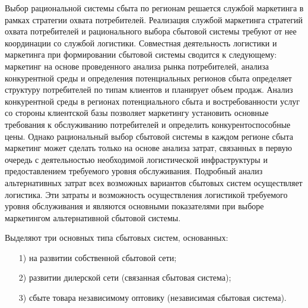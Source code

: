Выбор рациональной системы сбыта по регионам решается службой маркетинга в рамках стратегии охвата потребителей.
Реализация службой маркетинга стратегий охвата  потребителей и рационального выбора сбытовой системы требуют от нее координации со службой логистики.
Совместная деятельность логистики и маркетинга при формировании сбытовой системы сводится к следующему: маркетинг на основе проведенного анализа рынка потребителей, анализа конкурентной среды и определения потенциальных регионов сбыта определяет структуру потребителей по типам клиентов и планирует объем продаж.
Анализ конкурентной среды в регионах потенциального сбыта и востребованности услуг со стороны клиентской базы позволяет маркетингу установить основные требования к обслуживанию потребителей и определить конкурентоспособные цены.
Однако рациональный выбор сбытовой системы в каждом регионе сбыта маркетинг может сделать только на основе анализа затрат, связанных в первую очередь с деятельностью необходимой логистической инфраструктуры и предоставлением требуемого уровня обслуживания.
Подробный анализ альтернативных затрат всех возможных вариантов сбытовых систем осуществляет логистика.
Эти затраты и возможность осуществления логистикой требуемого уровня обслуживания и являются основными показателями при выборе маркетингом альтернативной сбытовой системы.

Выделяют три основных типа сбытовых систем, основанных:
\begin{enumerate}
	\item [1)] на развитии собственной сбытовой сети;
	\item [2)] развитии дилерской сети (связанная сбытовая система);
	\item [3)] сбыте товара независимому оптовику (независимая сбытовая система).
\end{enumerate}
\cite[с. 251--254 ]{dybskaya}
















